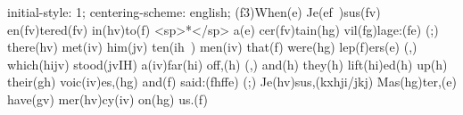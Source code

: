 initial-style: 1;
centering-scheme: english;
(f3)When(e) Je(ef~)sus(fv) en(fv)tered(fv) in(hv)to(f) <sp>*</sp> a(e) cer(fv)tain(hg) vil(fg)lage:(fe) (;) there(hv) met(iv) him(jv) ten(ih~) men(iv) that(f) were(hg) lep(f)ers(e) (,) which(hijv) stood(jvIH) a(iv)far(hi) off,(h) (,) and(h) they(h) lift(hi)ed(h) up(h) their(gh) voic(iv)es,(hg) and(f) said:(fhffe) (;) Je(hv)sus,(kxhji/jkj) Mas(hg)ter,(e) have(gv) mer(hv)cy(iv) on(hg) us.(f)

